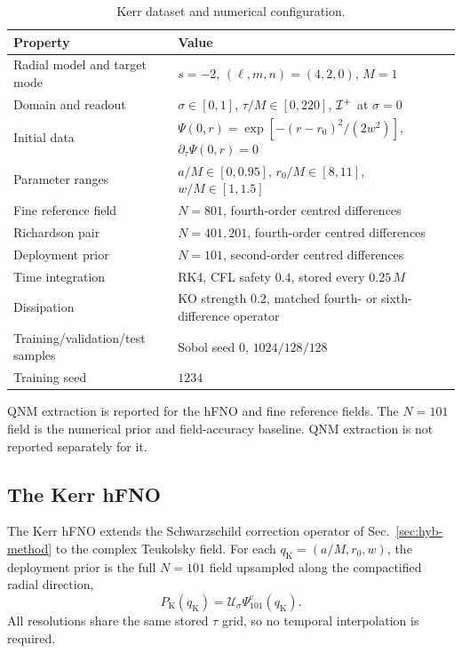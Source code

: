 \begin{table}[!htbp]
\centering
\caption{Kerr dataset and numerical configuration.}
\label{tab:kerr-numerics}
\footnotesize
\setlength{\tabcolsep}{5pt}
\begin{tabular}{@{}ll@{}}
\toprule
Property & Value \\
\midrule
Radial model and target mode & $s=-2$, $(\ell,m,n)=(4,2,0)$, $M=1$ \\
Domain and readout & $\sigma\in[0,1]$, $\tau/M\in[0,220]$, $\mathcal{I}^{+}$ at $\sigma=0$ \\
Initial data & $\Psi(0,r)=\exp[-(r-r_0)^2/(2w^2)]$, $\partial_\tau\Psi(0,r)=0$ \\
Parameter ranges & $a/M\in[0,0.95]$, $r_0/M\in[8,11]$, $w/M\in[1,1.5]$ \\
Fine reference field & $N=801$, fourth-order centred differences \\
Richardson pair & $N=401,201$, fourth-order centred differences \\
Deployment prior & $N=101$, second-order centred differences \\
Time integration & RK4, CFL safety $0.4$, stored every $0.25\,M$ \\
Dissipation & KO strength $0.2$, matched fourth- or sixth-difference operator \\
Training/validation/test samples & Sobol seed $0$, $1024/128/128$ \\
Training seed & $1234$ \\
\bottomrule
\end{tabular}
\end{table}

QNM extraction is reported for the hFNO and fine reference fields.
The $N=101$ field is the numerical prior and field-accuracy baseline.
QNM extraction is not reported separately for it.

\subsection{The Kerr hFNO}
\label{sec:kerr-method}

The Kerr hFNO extends the Schwarzschild correction operator of
Sec.~\ref{sec:hyb-method} to the complex Teukolsky field. For each
$q_{\mathrm K}=(a/M,r_0,w)$, the deployment prior is the full
$N=101$ field upsampled along the compactified radial direction,
\begin{equation}
  P_{\mathrm K}(q_{\mathrm K})
  =\mathcal U_\sigma\Psi_{101}^{\mathrm c}(q_{\mathrm K}).
  \label{eq:kerr-prior}
\end{equation}
All resolutions share the same stored $\tau$ grid, so no temporal
interpolation is required.

